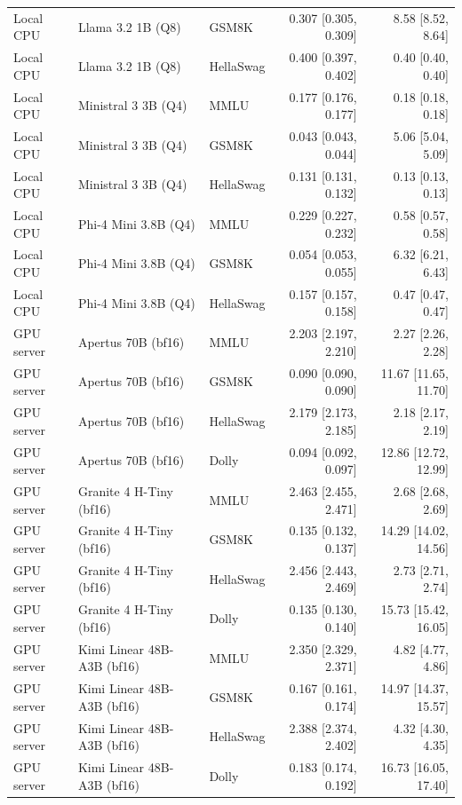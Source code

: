 \begin{longtable}{@{}l l l r r@{}}
Local CPU & Llama 3.2 1B (Q8) & GSM8K & 0.307 [0.305, 0.309] & 8.58 [8.52, 8.64] \\
Local CPU & Llama 3.2 1B (Q8) & HellaSwag & 0.400 [0.397, 0.402] & 0.40 [0.40, 0.40] \\
Local CPU & Ministral 3 3B (Q4) & MMLU & 0.177 [0.176, 0.177] & 0.18 [0.18, 0.18] \\
Local CPU & Ministral 3 3B (Q4) & GSM8K & 0.043 [0.043, 0.044] & 5.06 [5.04, 5.09] \\
Local CPU & Ministral 3 3B (Q4) & HellaSwag & 0.131 [0.131, 0.132] & 0.13 [0.13, 0.13] \\
Local CPU & Phi-4 Mini 3.8B (Q4) & MMLU & 0.229 [0.227, 0.232] & 0.58 [0.57, 0.58] \\
Local CPU & Phi-4 Mini 3.8B (Q4) & GSM8K & 0.054 [0.053, 0.055] & 6.32 [6.21, 6.43] \\
Local CPU & Phi-4 Mini 3.8B (Q4) & HellaSwag & 0.157 [0.157, 0.158] & 0.47 [0.47, 0.47] \\
\midrule
GPU server & Apertus 70B (bf16) & MMLU & 2.203 [2.197, 2.210] & 2.27 [2.26, 2.28] \\
GPU server & Apertus 70B (bf16) & GSM8K & 0.090 [0.090, 0.090] & 11.67 [11.65, 11.70] \\
GPU server & Apertus 70B (bf16) & HellaSwag & 2.179 [2.173, 2.185] & 2.18 [2.17, 2.19] \\
GPU server & Apertus 70B (bf16) & Dolly & 0.094 [0.092, 0.097] & 12.86 [12.72, 12.99] \\
GPU server & Granite 4 H-Tiny (bf16) & MMLU & 2.463 [2.455, 2.471] & 2.68 [2.68, 2.69] \\
GPU server & Granite 4 H-Tiny (bf16) & GSM8K & 0.135 [0.132, 0.137] & 14.29 [14.02, 14.56] \\
GPU server & Granite 4 H-Tiny (bf16) & HellaSwag & 2.456 [2.443, 2.469] & 2.73 [2.71, 2.74] \\
GPU server & Granite 4 H-Tiny (bf16) & Dolly & 0.135 [0.130, 0.140] & 15.73 [15.42, 16.05] \\
GPU server & Kimi Linear 48B-A3B (bf16) & MMLU & 2.350 [2.329, 2.371] & 4.82 [4.77, 4.86] \\
GPU server & Kimi Linear 48B-A3B (bf16) & GSM8K & 0.167 [0.161, 0.174] & 14.97 [14.37, 15.57] \\
GPU server & Kimi Linear 48B-A3B (bf16) & HellaSwag & 2.388 [2.374, 2.402] & 4.32 [4.30, 4.35] \\
GPU server & Kimi Linear 48B-A3B (bf16) & Dolly & 0.183 [0.174, 0.192] & 16.73 [16.05, 17.40] \\

\end{longtable}
